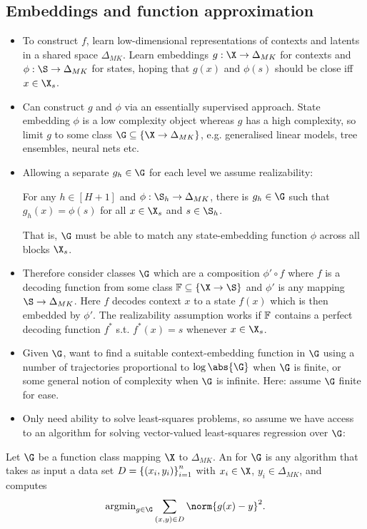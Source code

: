 \documentclass[11pt, openany]{book}
\begin{document}
\subsection{Embeddings and function approximation}
\begin{itemize}
    \item To construct $f$, learn low-dimensional representations of contexts and latents in a shared space $\Delta_{MK}$. Learn embeddings $g:\X\to\Delta_{MK}$ for contexts and $\phi:\S\to\Delta_{MK}$ for states, hoping that $g(x)$ and $\phi(s)$ should be close iff $x\in\X_s$.
    \item Can construct $g$ and $\phi$ via an essentially supervised approach. State embedding $\phi$ is a low complexity object whereas $g$ has a high complexity, so limit $g$ to some class $\G\subseteq\set{\X\to\Delta_{MK}}$, e.g. generalised linear models, tree ensembles, neural nets etc.
    \item Allowing a separate $g_h\in\G$ for each level we assume realizability:
        \begin{definition}[Realizability]
            For any $h\in [H+1]$ and $\phi:\S_h\to\Delta_{MK}$, there is $g_h\in\G$ such that $g_h(x)=\phi(s)$ for all $x\in\X_s$ and $s\in\S_h$.
        \end{definition}
        That is, $\G$ must be able to match any state-embedding function $\phi$ across all blocks $\X_s$.
    \item Therefore consider classes $\G$ which are a composition $\phi'\circ f$ where $f$ is a decoding function from some class $\F\subseteq\set{\X\to\S}$ and $\phi'$ is any mapping $\S\to\Delta_{MK}$. Here $f$ decodes context $x$ to a state $f(x)$ which is then embedded by $\phi'$. The realizability assumption works if $\mathbb{F}$ contains a perfect decoding function $f^*$ s.t. $f^*(x)=s$ whenever $x\in\X_s$.
    \item Given $\G$, want to find a suitable context-embedding function in $\G$ using a number of trajectories proportional to $\log\abs{\G}$ when $\G$ is finite, or some general notion of complexity when $\G$ is infinite. Here: assume $\G$ finite for ease.
    \item Only need ability to solve least-squares problems, so assume we have access to an algorithm for solving vector-valued least-squares regression over $\G$:
\end{itemize}

\begin{definition}
    Let $\G$ be a function class mapping $\X$ to $\Delta_{MK}$. An  for $\G$ is any algorithm that takes as input a data set $D=\left\lbrace(x_i,y_i)\right\rbrace_{i=1}^n$ with $x_i\in\X$, $y_i\in\Delta_{MK}$, and computes
    \[
        \argmin_{g\in\G} \sum_{(x,y)\in D} \norm{g(x)-y}^2.
    \]
\end{definition}
\end{document}
